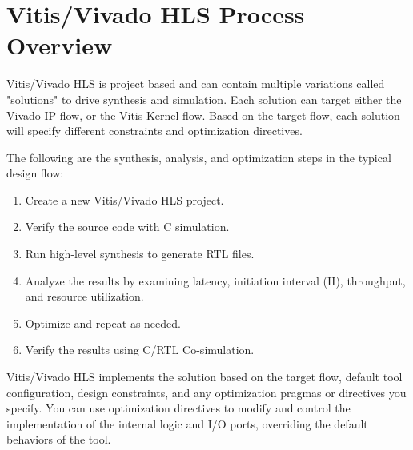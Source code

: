 \clearpage
\section{Vitis/Vivado HLS Process Overview}
Vitis/Vivado HLS is project based and can contain multiple variations called "solutions" to drive synthesis
and simulation. Each solution can target either the Vivado IP flow, or the Vitis Kernel flow. Based
on the target flow, each solution will specify different constraints and optimization directives.

\par The following are the synthesis, analysis, and optimization steps in the typical design flow:
\begin{enumerate}
  \item Create a new Vitis/Vivado HLS project.
  \item Verify the source code with C simulation.
  \item Run high-level synthesis to generate RTL files.
  \item Analyze the results by examining latency, initiation interval (II), throughput, and resource utilization.
  \item Optimize and repeat as needed.
  \item Verify the results using C/RTL Co-simulation.
\end{enumerate}

Vitis/Vivado HLS implements the solution based on the target flow, default tool configuration, design
constraints, and any optimization pragmas or directives you specify. You can use optimization
directives to modify and control the implementation of the internal logic and I/O ports,
overriding the default behaviors of the tool.


